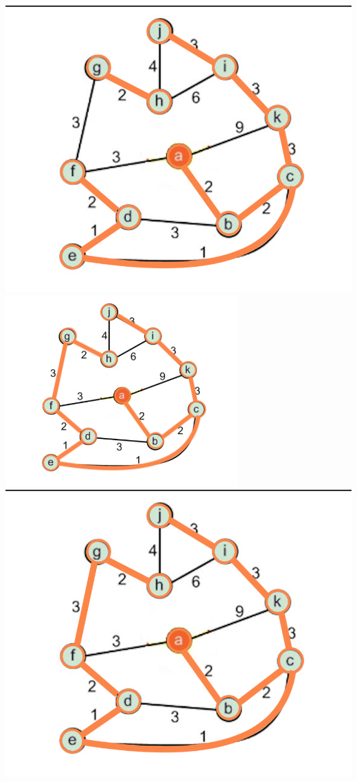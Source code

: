 \documentclass[a4paper]{exam}
\begin{document}
\begin{questions}
\begin{parts}
\begin{solution}
    \includegraphics[scale=0.25]{Q3/images3e/3e10}
    \includegraphics[scale=0.6]{Q3/images3e/3e1}
    \includegraphics[scale=0.25]{Q3/images3e/3e11}\\

\end{solution}
\end{parts}
\end{questions}
\end{document}
